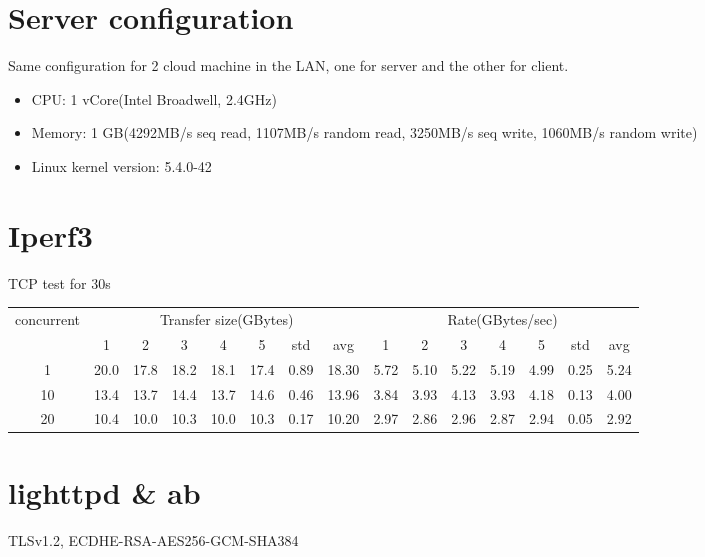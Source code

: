 \documentclass{article}
\begin{document}
\section*{Server configuration}
Same configuration for 2 cloud machine in the LAN, one for server and the other for client.
\begin{itemize}
    \item CPU: 1 vCore(Intel Broadwell, 2.4GHz)
    \item Memory: 1 GB(4292MB/s seq read, 1107MB/s random read, 3250MB/s seq write, 1060MB/s random write)
    \item Linux kernel version: 5.4.0-42
\end{itemize}
\section*{Iperf3}
TCP test for 30s
\begin{table}[H]
    \begin{tabular}{|c|c|c|c|c|c|c|c|c|c|c|c|c|c|c|}
        \hline
        \multirow{2}{*}{concurrent} & \multicolumn{7}{c|}{Transfer size(GBytes)} & \multicolumn{7}{c|}{Rate(GBytes/sec)}                                                                                      \\ \cline{2-15}
                                    & 1                                          & 2                                     & 3    & 4    & 5    & std  & avg   & 1    & 2    & 3    & 4    & 5    & std  & avg  \\ \hline
        1                           & 20.0                                       & 17.8                                  & 18.2 & 18.1 & 17.4 & 0.89 & 18.30 & 5.72 & 5.10 & 5.22 & 5.19 & 4.99 & 0.25 & 5.24 \\ \hline
        10                          & 13.4                                       & 13.7                                  & 14.4 & 13.7 & 14.6 & 0.46 & 13.96 & 3.84 & 3.93 & 4.13 & 3.93 & 4.18 & 0.13 & 4.00 \\ \hline
        20                          & 10.4                                       & 10.0                                  & 10.3 & 10.0 & 10.3 & 0.17 & 10.20 & 2.97 & 2.86 & 2.96 & 2.87 & 2.94 & 0.05 & 2.92 \\ \hline
    \end{tabular}
\end{table}
\section*{lighttpd \& ab}
TLSv1.2, ECDHE-RSA-AES256-GCM-SHA384
\end{document}
